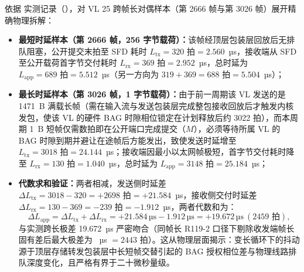 依据  实测记录（），对 VL 25 跨帧长对偶样本（第 2666 帧与第 3026 帧）展开精确物理拆解：
\begin{itemize}
  \item \textbf{最短时延样本（第 2666 帧，256 字节载荷）：}该帧经顶层包装层回放后无排队阻塞，公开提交末拍至 SFD 耗时 $L_\text{tx} = 320\text{ 拍} = 2.560$~µs，接收端从 SFD 至公开载荷首字节交付耗时 $L_\text{rx} = 369\text{ 拍} = 2.952$~µs，总时延为 $L_\text{app} = 689\text{ 拍} = 5.512$~µs（另一方向为 $319 + 369 = 688\text{ 拍} = 5.504$~µs）；
  \item \textbf{最长时延样本（第 3026 帧，1 字节载荷）：}由于前一周期该 VL 发送的是 1471~B 满载长帧（需在输入流与发送包装层完成整包接收回放后才触发内核发包，使该 VL 的硬件 BAG 时隙相位锁定在计划释放后约 3022 拍），而本周期 1~B 短帧仅需数拍即在公开端口完成提交（$M$），必须等待所属 VL 的 BAG 时隙到期并避让在途帧后方能发出，致使发送时延增至 $L_\text{tx} = 3018\text{ 拍} = 24.144$~µs；接收端因最小以太网帧极短，首字节交付耗时降至 $L_\text{rx} = 130\text{ 拍} = 1.040$~µs，总时延为 $L_\text{app} = 3148\text{ 拍} = 25.184$~µs；
  \item \textbf{代数求和验证：}两者相减，发送侧时延差 $\Delta L_\text{tx} = 3018 - 320 = +2698\text{ 拍} = +21.584$~µs，接收侧交付时延差 $\Delta L_\text{rx} = 130 - 369 = -239\text{ 拍} = -1.912$~µs，两者代数和为：
    \begin{equation}
      \Delta L_\text{app} = \Delta L_\text{tx} + \Delta L_\text{rx} = +21.584\,\text{µs} - 1.912\,\text{µs} = +19.672\,\text{µs}\ (2459\text{ 拍}),
    \end{equation}
    与实测跨长极差 19.672~µs 严密吻合（同帧长 R119-2 口径下剔除收发端帧长固有差后最大极差为 \JitVarCycleTop~µs $= 2443$ 拍）。这从物理层面揭示：变长循环下的抖动源于顶层存储转发包装层中长短帧交替引起的 BAG 授权相位差与物理线路排队深度变化，且严格有界于二十微秒量级。
\end{itemize}

